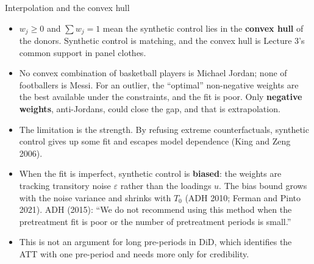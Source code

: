 \documentclass[
  11pt,
  ignorenonframetext,
  aspectratio=169,
]{beamer}
\newcounter{none} %
\providecommand{\tightlist}{%
  \setlength{\itemsep}{0pt}\setlength{\parskip}{0pt}}
\begin{document}
\begin{frame}{Interpolation and the convex hull}
\protect{}\label{interpolation-and-the-convex-hull}
\begin{itemize}
\tightlist
\item
  \(w_j \geq 0\) and \(\sum w_j = 1\) mean the synthetic control lies in
  the \textbf{convex hull} of the donors. Synthetic control is matching,
  and the convex hull is Lecture 3's common support in panel clothes.
\item
  No convex combination of basketball players is Michael Jordan; none of
  footballers is Messi. For an outlier, the ``optimal'' non-negative
  weights are the best available under the constraints, and the fit is
  poor. Only \textbf{negative weights}, anti-Jordans, could close the
  gap, and that is extrapolation.
\item
  The limitation is the strength. By refusing extreme counterfactuals,
  synthetic control gives up some fit and escapes model dependence (King
  and Zeng 2006).
\end{itemize}

\vspace{0.4em}

\begin{itemize}
\tightlist
\item
  When the fit is imperfect, synthetic control is \textbf{biased}: the
  weights are tracking transitory noise \(\varepsilon\) rather than the
  loadings \(u\). The bias bound grows with the noise variance and
  shrinks with \(T_0\) (ADH 2010; Ferman and Pinto 2021). ADH (2015):
  ``We do not recommend using this method when the pretreatment fit is
  poor or the number of pretreatment periods is small.''
\item
  This is not an argument for long pre-periods in DiD, which identifies
  the ATT with one pre-period and needs more only for credibility.
\end{itemize}
\end{frame}
\end{document}
